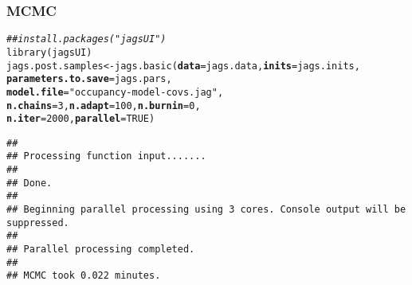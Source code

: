 \documentclass[color=usenames,dvipsnames]{beamer}\usepackage[]{graphicx}\usepackage[]{color}
\makeatletter
\newcommand{\hlnum}[1]{\textcolor[rgb]{0.69,0.494,0}{#1}}%
\newcommand{\hlstr}[1]{\textcolor[rgb]{0.749,0.012,0.012}{#1}}%
\newcommand{\hlcom}[1]{\textcolor[rgb]{0.514,0.506,0.514}{\textit{#1}}}%
\newcommand{\hlstd}[1]{\textcolor[rgb]{0,0,0}{#1}}%
\newcommand{\hlkwb}[1]{\textcolor[rgb]{0,0.341,0.682}{#1}}%
\newcommand{\hlkwc}[1]{\textcolor[rgb]{0,0,0}{\textbf{#1}}}%
\newcommand{\hlkwd}[1]{\textcolor[rgb]{0.004,0.004,0.506}{#1}}%
\newenvironment{kframe}{%
 \def\at@end@of@kframe{}%
 \ifinner\ifhmode%
  \def\at@end@of@kframe{\end{minipage}}%
  \begin{minipage}{\columnwidth}%
 \fi\fi%
 \def\FrameCommand##1{\hskip\@totalleftmargin \hskip-\fboxsep
 \colorbox{shadecolor}{##1}\hskip-\fboxsep
     \hskip-\linewidth \hskip-\@totalleftmargin \hskip\columnwidth}%
 \MakeFramed {\advance\hsize-\width
   \@totalleftmargin\z@ \linewidth\hsize
   \@setminipage}}%
 {\par\unskip\endMakeFramed%
 \at@end@of@kframe}
\newenvironment{knitrout}{}{} %
\makeatother
\begin{document}
\begin{frame}[fragile]
  \frametitle{MCMC}
  \small
\begin{knitrout}\scriptsize
{}\color{fgcolor}\begin{kframe}
\begin{alltt}
\hlcom{## install.packages("jagsUI")}
\hlkwd{library}\hlstd{(jagsUI)}
\hlstd{jags.post.samples} \hlkwb{<-} \hlkwd{jags.basic}\hlstd{(}\hlkwc{data}\hlstd{=jags.data,} \hlkwc{inits}\hlstd{=jags.inits,}
                                \hlkwc{parameters.to.save}\hlstd{=jags.pars,}
                                \hlkwc{model.file}\hlstd{=}\hlstr{"occupancy-model-covs.jag"}\hlstd{,}
                                \hlkwc{n.chains}\hlstd{=}\hlnum{3}\hlstd{,} \hlkwc{n.adapt}\hlstd{=}\hlnum{100}\hlstd{,} \hlkwc{n.burnin}\hlstd{=}\hlnum{0}\hlstd{,}
                                \hlkwc{n.iter}\hlstd{=}\hlnum{2000}\hlstd{,} \hlkwc{parallel}\hlstd{=}\hlnum{TRUE}\hlstd{)}
\end{alltt}
\begin{verbatim}
## 
## Processing function input....... 
## 
## Done. 
##  
## Beginning parallel processing using 3 cores. Console output will be suppressed.
## 
## Parallel processing completed.
## 
## MCMC took 0.022 minutes.
\end{verbatim}
\end{kframe}
\end{knitrout}
\end{frame}
\end{document}
